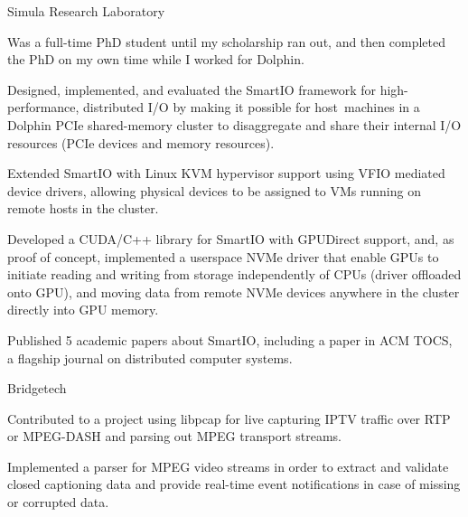 \begin{experience}{Simula Research Laboratory}{
}
    \item{Was a full-time PhD student until my scholarship ran out, and then completed the PhD on my own time while I worked for Dolphin.}
    \item{Designed, implemented, and evaluated the SmartIO framework for high-performance, distributed I/O by making it possible for  host~machines in a Dolphin PCIe shared-memory cluster to disaggregate and share their internal I/O resources (PCIe devices and memory resources).}
    \item{Extended SmartIO with Linux KVM hypervisor support using VFIO mediated device drivers, allowing physical devices to be assigned to VMs running on remote hosts in the cluster.}
    \item{Developed a CUDA/C++ library for SmartIO with GPUDirect support, and, as proof of concept, implemented a userspace NVMe driver that enable GPUs to initiate reading and writing from storage independently of CPUs (driver offloaded onto GPU), and moving data from remote NVMe devices anywhere in the cluster directly into GPU memory.}
    \item{Published 5 academic papers about SmartIO, including a paper in ACM TOCS, a flagship journal on distributed computer systems.}
\end{experience}

\begin{experience}{Bridgetech}{}
    \item{Contributed to a project using libpcap for live capturing IPTV traffic over RTP or MPEG-DASH and parsing out MPEG transport streams.}
    \item{Implemented a parser for MPEG video streams in order to extract and validate closed captioning data and provide real-time event notifications in case of missing or corrupted data.}
\end{experience}




